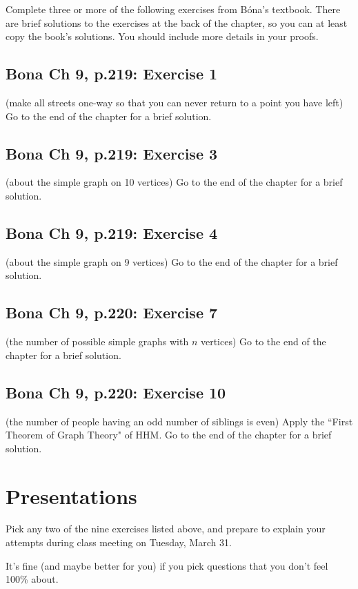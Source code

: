 \documentclass[10pt]{amsart}
\begin{document}
Complete three or more of the following exercises from B\'ona's textbook.
There are brief solutions to the exercises at the back of the chapter, so you can at least copy the book's solutions.
You should include more details in your proofs.

\subsection*{
Bona Ch 9, p.219: Exercise 1} 
(make all streets one-way so that you can never return to a point you have left) Go to the end of the chapter for a brief solution.

\subsection*{
Bona Ch 9, p.219: Exercise 3
}
(about the simple graph on 10 vertices) Go to the end of the chapter for a brief solution.

\subsection*{
Bona Ch 9, p.219: Exercise 4
}
(about the simple graph on 9 vertices) Go to the end of the chapter for a brief solution.

\subsection*{
Bona Ch 9, p.220: Exercise 7
}
(the number of possible simple graphs with $n$ vertices) Go to the end of the chapter for a brief solution.

\subsection*{
Bona Ch 9, p.220: Exercise 10
}
(the number of people having an odd number of siblings is even) Apply the ``First Theorem of Graph Theory" of HHM. Go to the end of the chapter for a brief solution.



\section{Presentations}
Pick any two of the nine exercises listed above, and prepare to explain your attempts during class meeting on Tuesday, March 31. 

It's fine (and maybe better for you) if you pick questions that you don't feel 100\% about.
\end{document}

